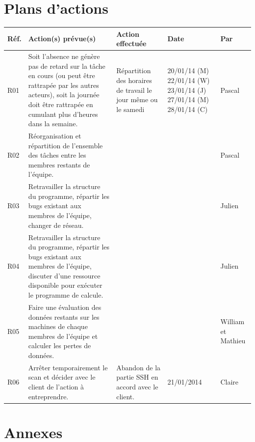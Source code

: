\documentclass[a4paper,11pt,french]{article}
\begin{document}
\section{Plans d'actions}
\begin{center}
\begin{tabular}{|l|p{7cm}|p{5cm}|p{2.5cm}|p{1.5cm}|}
\hline
\textbf{Réf.}&\textbf{Action(s) prévue(s)}&\textbf{Action effectuée}&\textbf{Date}&\textbf{Par}\\
\hline
        R01 &
        Soit l'absence ne génère pas de retard sur la tâche en cours (ou peut être rattrapée par les autres acteurs), soit la journée doit être rattrapée en cumulant plus d'heures dans la semaine.
         & Répartition des horaires de travail le jour même ou le samedi & 20/01/14 (M) 22/01/14 (W) 23/01/14 (J) 27/01/14 (M) 28/01/14 (C) & Pascal \\
\hline
        R02 &
        	Réorganisation et répartition de l'ensemble des tâches entre les membres restants de l'équipe.
         & & & Pascal\\
\hline
        R03 &
        Retravailler la structure du programme, répartir les bugs existant aux membres de l'équipe, changer de réseau. & & & Julien\\
\hline
R04 &
        Retravailler la structure du programme, répartir les bugs existant aux membres de l'équipe, discuter d'une ressource disponible pour exécuter le programme de calcule.& & & Julien\\
\hline
R05 &
        Faire une évaluation des données restants sur les machines de chaque membres de l'équipe et calculer les pertes de données. & & & William et Mathieu\\
\hline
R06 & Arrêter temporairement le scan et décider avec le client de l'action à entreprendre. & Abandon de la partie SSH en accord avec le client. & 21/01/2014 & Claire\\
\hline
\end{tabular}
\end{center}

\section{Annexes}
\end{document}
